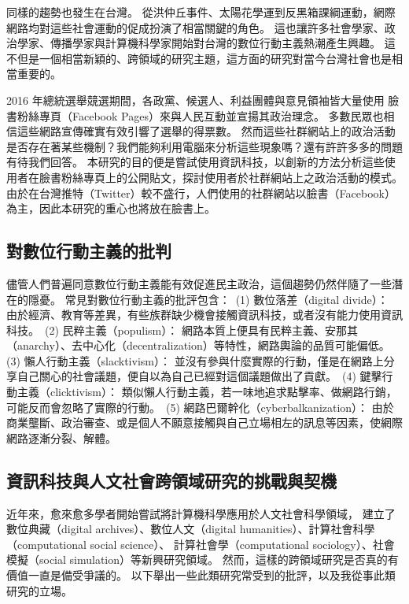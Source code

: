\documentclass[letterpaper, 10pt, conference]{ieeeconf}   %
\begin{document}
\begin{CJK}{UTF8}{bsmi}
同樣的趨勢也發生在台灣。%
從洪仲丘事件、太陽花學運到反黑箱課綱運動，網際網路均對這些社會運動的促成扮演了相當關鍵的角色。%
這也讓許多社會學家、政治學家、傳播學家與計算機科學家開始對台灣的數位行動主義熱潮產生興趣。%
這不但是一個相當新穎的、跨領域的研究主題，這方面的研究對當今台灣社會也是相當重要的。%

2016 年總統選舉競選期間，各政黨、候選人、利益團體與意見領袖皆大量使用%
臉書粉絲專頁（Facebook Pages）來與人民互動並宣揚其政治理念。%
多數民眾也相信這些網路宣傳確實有效引響了選舉的得票數。%
然而這些社群網站上的政治活動是否存在著某些機制？我們能夠利用電腦來分析這些現象嗎？還有許許多多的問題有待我們回答。%
本研究的目的便是嘗試使用資訊科技，以創新的方法分析這些使用者在臉書粉絲專頁上的公開貼文，探討使用者於社群網站上之政治活動的模式。%
由於在台灣推特（Twitter）較不盛行，人們使用的社群網站以臉書（Facebook）為主，因此本研究的重心也將放在臉書上。%

\subsection*{對數位行動主義的批判}

儘管人們普遍同意數位行動主義能有效促進民主政治，這個趨勢仍然伴隨了一些潛在的隱憂。%
常見對數位行動主義的批評包含：%
\,(1) 數位落差（digital divide）：%
由於經濟、教育等差異，有些族群缺少機會接觸資訊科技，或者沒有能力使用資訊科技。%
\,(2) 民粹主義（populism）：%
網路本質上便具有民粹主義、安那其（anarchy）、去中心化（decentralization）等特性，網路輿論的品質可能偏低。%
\,(3) 懶人行動主義（slacktivism）：%
並沒有參與什麼實際的行動，僅是在網路上分享自己關心的社會議題，便自以為自己已經對這個議題做出了貢獻。%
\,(4) 鍵擊行動主義（clicktivism）：%
類似懶人行動主義，若一味地追求點擊率、做網路行銷，可能反而會忽略了實際的行動。%
\,(5) 網路巴爾幹化（cyberbalkanization）：%
由於商業壟斷、政治審查、或是個人不願意接觸與自己立場相左的訊息等因素，使網際網路逐漸分裂、解體。%

\subsection*{資訊科技與人文社會跨領域研究的挑戰與契機}

近年來，愈來愈多學者開始嘗試將計算機科學應用於人文社會科學領域，%
建立了數位典藏（digital archives）、數位人文（digital humanities）、計算社會科學（computational social science）、%
計算社會學（computational sociology）、社會模擬（social simulation）等新興研究領域。%
然而，這樣的跨領域研究是否真的有價值一直是備受爭議的。%
以下舉出一些此類研究常受到的批評，以及我從事此類研究的立場。%


\end{CJK}
\end{document}
